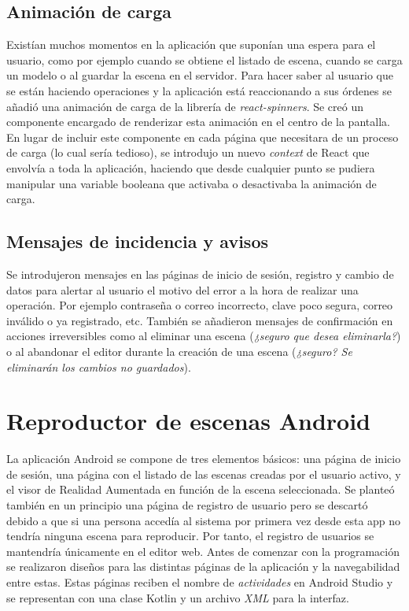 \subsection{Animación de carga}

Existían muchos momentos en la aplicación que suponían una espera para el usuario, como por ejemplo cuando se obtiene el listado de escena, cuando se carga un modelo o al guardar la escena en el servidor. Para hacer saber al usuario que se están haciendo operaciones y la aplicación está reaccionando a sus órdenes se añadió una animación de carga de la librería de \textit{react-spinners}\cite{reactspinners}. Se creó un componente encargado de renderizar esta animación en el centro de la pantalla. En lugar de incluir este componente en cada página que necesitara de un proceso de carga (lo cual sería tedioso), se introdujo un nuevo \textit{context} de React que envolvía a toda la aplicación, haciendo que desde cualquier punto se pudiera manipular una variable booleana que activaba o desactivaba la animación de carga.

\subsection{Mensajes de incidencia y avisos}

Se introdujeron mensajes en las páginas de inicio de sesión, registro y cambio de datos para alertar al usuario el motivo del error a la hora de realizar una operación. Por ejemplo contraseña o correo incorrecto, clave poco segura, correo inválido o ya registrado, etc. También se añadieron mensajes de confirmación en acciones irreversibles como al eliminar una escena (\textit{¿seguro que desea eliminarla?}) o al abandonar el editor durante la creación de una escena (\textit{¿seguro? Se eliminarán los cambios no guardados}).

\section{Reproductor de escenas Android}

La aplicación Android se compone de tres elementos básicos: una página de inicio de sesión, una página con el listado de las escenas creadas por el usuario activo, y el visor de Realidad Aumentada en función de la escena seleccionada. Se planteó también en un principio una página de registro de usuario pero se descartó debido a que si una persona accedía al sistema por primera vez desde esta app no tendría ninguna escena para reproducir. Por tanto, el registro de usuarios se mantendría únicamente en el editor web. Antes de comenzar con la programación se realizaron diseños para las distintas páginas de la aplicación y la navegabilidad entre estas. Estas páginas reciben el nombre de \textit{actividades} en Android Studio y se representan con una clase Kotlin y un archivo \textit{XML} para la interfaz.

